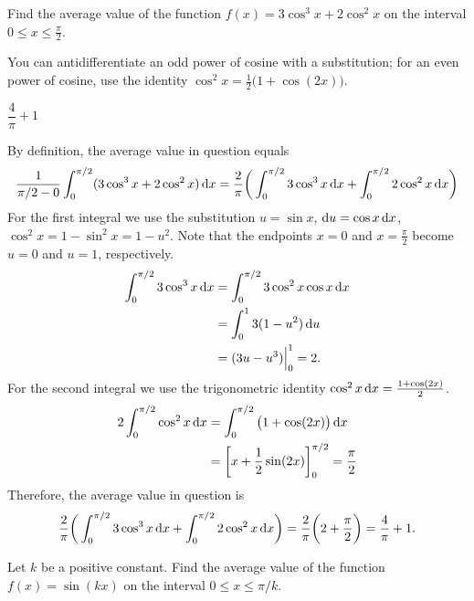 \begin{question}[2016A]
Find the average value of the function $f(x) = 3\cos^3x + 2\cos^2x$ on the interval $0\le x\le\frac\pi2$.
\end{question}

\begin{hint}
You can antidifferentiate an odd power of cosine with a substitution; for an even power of cosine, use the identity $\cos^2 x = \frac{1}{2}\big(1+\cos(2x)\big)$.
\end{hint}

\begin{answer}
$\dfrac{4}{\pi}+1$
\end{answer}

\begin{solution}
By definition, the average value in question equals
\begin{equation*}
\frac1{\pi/2-0} \int_0^{\pi/2} ( 3\cos^3x + 2\cos^2x ) \,\mathrm{d}x
= \frac2\pi \bigg( \int_0^{\pi/2} 3\cos^3x \,\mathrm{d}x + \int_0^{\pi/2} 2\cos^2x \,\mathrm{d}x \bigg)
\end{equation*}
For the first integral we use the substitution $u = \sin x$,
$\mathrm{d}u=\cos x\,\mathrm{d}x$, $\cos^2 x=1-\sin^2 x = 1-u^2$.
Note that the endpoints
$x=0$ and $x=\frac\pi2$ become $u=0$ and $u=1$, respectively.
\begin{align*}
\int_0^{\pi/2} 3 \cos^3x \,\mathrm{d}x
&= \int_0^{\pi/2} 3 \cos^2 x \cos x \,\mathrm{d}x \\
&= \int_0^{1} 3(1-u^2) \,\mathrm{d}u \\
&= (3u-u^3)\Big|_0^1 = 2.
\end{align*}
For the second integral we use the trigonometric identity
$\cos^2x\,\mathrm{d}x = \frac{1 + \cos(2x)}{2}$.
\begin{align*}
2 \int_0^{\pi/2} \cos^2x\,\mathrm{d}x
&= \int_0^{\pi/2} \big(1 + \cos(2x) \big) \,\mathrm{d}x \\
&= \bigg[ x + \frac{1}{2}\sin(2x) \bigg]_0^{\pi/2}
= \frac\pi2
\end{align*}
Therefore, the average value in question is
\begin{equation*}
\frac2\pi \bigg( \int_0^{\pi/2} 3\cos^3x \,\mathrm{d}x + \int_0^{\pi/2} 2\cos^2x \,\mathrm{d}x \bigg)
= \frac2\pi \bigg( 2 + \frac\pi2 \bigg)
= \frac{4}{\pi}+1.
\end{equation*}


\end{solution}


\begin{question}[2012A]
Let $k$ be a positive constant.
Find the average value of the function $f(x) = \sin(kx)$ on the interval
$0\le x\le \pi/k$.
\end{question}

